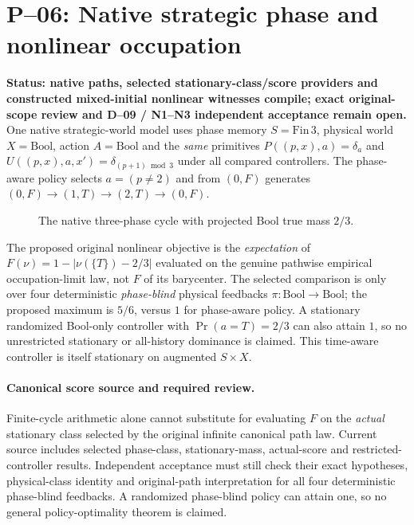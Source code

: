 \section{P--06: Native strategic phase and nonlinear occupation}
\textbf{Status: native paths, selected stationary-class/score providers and constructed mixed-initial nonlinear witnesses compile; exact original-scope review and D--09 / N1--N3 independent acceptance remain open.}
One native strategic-world model uses phase memory $S=\mathrm{Fin}\,3$,
physical world $X=\mathrm{Bool}$, action $A=\mathrm{Bool}$ and the
\emph{same} primitives $P((p,x),a)=\delta_a$ and
$U((p,x),a,x')=\delta_{(p+1)\bmod3}$ under all compared controllers.
The phase-aware policy selects $a=(p\neq2)$ and from $(0,F)$ generates
$(0,F)\to(1,T)\to(2,T)\to(0,F)$.
\begin{figure}[htbp]\centering
{}
\caption{The native three-phase cycle with projected Bool true mass $2/3$.}
\end{figure}
The proposed original nonlinear objective is the \emph{expectation}
of $F(\nu)=1-|\nu(\{T\})-2/3|$ evaluated on the genuine pathwise
empirical occupation-limit law, not $F$ of its barycenter.
The selected comparison is only over four deterministic \emph{phase-blind}
physical feedbacks $\pi:\mathrm{Bool}\to\mathrm{Bool}$; the proposed maximum
is $5/6$, versus $1$ for phase-aware policy. A stationary randomized
Bool-only controller with $\Pr(a=T)=2/3$ can also attain $1$, so
no unrestricted stationary or all-history dominance is claimed.
This time-aware controller is itself stationary on augmented $S\times X$.


\paragraph{Canonical score source and required review.}
Finite-cycle arithmetic alone cannot substitute for evaluating
$F$ on the \emph{actual} stationary class selected by the original
infinite canonical path law. Current source includes selected
phase-class, stationary-mass, actual-score and restricted-controller
results. Independent acceptance must still check their exact
hypotheses, physical-class identity and original-path interpretation
for all four deterministic phase-blind feedbacks. A randomized
phase-blind policy can attain one, so no general policy-optimality
theorem is claimed.

